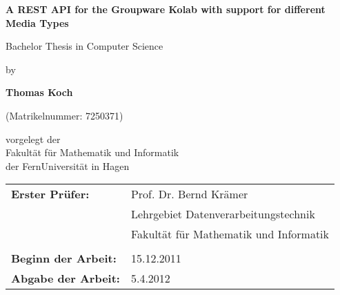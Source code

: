 \begin{titlepage}

\vspace*{0.2cm}
\begin{center}
\Huge{\textbf{A REST API for the Groupware Kolab with support for different Media Types}}
\vspace{1cm}

\large{Bachelor Thesis in Computer Science}

\vspace{1cm}

\normalsize{by}

\Large{\textbf{Thomas Koch}}

\normalsize{(Matrikelnummer: 7250371)}

\vspace{1.5cm}
\large{vorgelegt der \\
Fakultät für Mathematik und Informatik\\
der FernUniversität in Hagen}

\vspace{3.5cm}

\end{center}

\begin{tabular}{ll}
\textbf{Erster Prüfer:}	& Prof. Dr. Bernd Krämer\\
& Lehrgebiet Datenverarbeitungstechnik\\
& Fakultät für Mathematik und Informatik \\
& \\
\textbf{Beginn der Arbeit:} & 15.12.2011 \\
\textbf{Abgabe der Arbeit:} & 5.4.2012 \\
\end{tabular}

\end{titlepage}